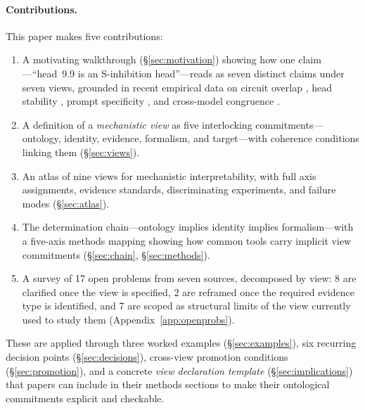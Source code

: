 \documentclass{article}
\begin{document}
\paragraph{Contributions.}
This paper makes five contributions:
\begin{enumerate}[leftmargin=*]
\item A motivating walkthrough (\S\ref{sec:motivation}) showing how one
      claim---``head~9.9 is an S-inhibition head''---reads as seven
      distinct claims under seven views, grounded in recent empirical
      data on circuit overlap \citep{merullo2024}, head stability
      \citep{bali2026}, prompt specificity \citep{franco2026}, and
      cross-model congruence \citep{sun2026}.
\item A definition of a \emph{mechanistic view} as five interlocking
      commitments---ontology, identity, evidence, formalism, and
      target---with coherence conditions linking them
      (\S\ref{sec:views}).
\item An atlas of nine views for mechanistic interpretability,
      with full axis assignments, evidence standards, discriminating
      experiments, and failure modes (\S\ref{sec:atlas}).
\item The determination chain---ontology implies identity implies
      formalism---with a five-axis methods mapping showing how common
      tools carry implicit view commitments
      (\S\ref{sec:chain}, \S\ref{sec:methods}).
\item A survey of 17 open problems from seven sources, decomposed by
      view: 8 are clarified once the view is specified, 2 are reframed
      once the required evidence type is identified, and 7 are scoped
      as structural limits of the view currently used to study them
      (Appendix~\ref{app:openprobs}).
\end{enumerate}
These are applied through three worked examples (\S\ref{sec:examples}),
six recurring decision points (\S\ref{sec:decisions}),
cross-view promotion conditions (\S\ref{sec:promotion}), and a
concrete \emph{view declaration template} (\S\ref{sec:implications})
that papers can include in their methods sections to make their
ontological commitments explicit and checkable.
\end{document}
